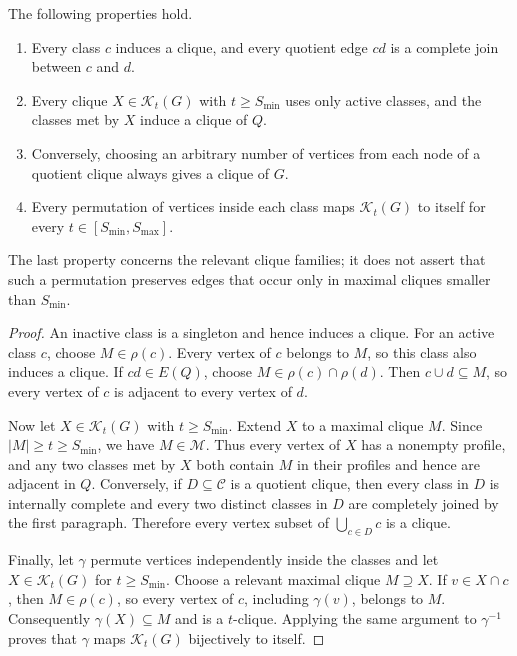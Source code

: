\begin{lemma}
\label{lem:relevant-class-symmetry}
The following properties hold.
\begin{enumerate}
\item Every class $c$ induces a clique, and every quotient edge $cd$ is a complete join between $c$ and $d$.
\item Every clique $X\in\mathcal K_t(G)$ with $t\geq S_{\min}$ uses only active classes, and the classes met by $X$ induce a clique of $Q$.
\item Conversely, choosing an arbitrary number of vertices from each node of a quotient clique always gives a clique of $G$.
\item Every permutation of vertices inside each class maps $\mathcal K_t(G)$ to itself for every $t\in[S_{\min},S_{\max}]$.
\end{enumerate}
The last property concerns the relevant clique families; it does not assert that such a permutation preserves edges that occur only in maximal cliques smaller than $S_{\min}$.
\end{lemma}
\begin{proof}
An inactive class is a singleton and hence induces a clique.
%
For an active class $c$, choose $M\in\rho(c)$.
%
Every vertex of $c$ belongs to $M$, so this class also induces a clique.
%
If $cd\in E(Q)$, choose $M\in\rho(c)\cap\rho(d)$.
%
Then $c\cup d\subseteq M$, so every vertex of $c$ is adjacent to every vertex of $d$.

Now let $X\in\mathcal K_t(G)$ with $t\geq S_{\min}$.
%
Extend $X$ to a maximal clique $M$.
%
Since $|M|\geq t\geq S_{\min}$, we have $M\in\mathcal M$.
%
Thus every vertex of $X$ has a nonempty profile, and any two classes met by $X$ both contain $M$ in their profiles and hence are adjacent in $Q$.
%
Conversely, if $D\subseteq\mathcal C$ is a quotient clique, then every class in $D$ is internally complete and every two distinct classes in $D$ are completely joined by the first paragraph.
%
Therefore every vertex subset of $\bigcup_{c\in D}c$ is a clique.

Finally, let $\gamma$ permute vertices independently inside the classes and let $X\in\mathcal K_t(G)$ for $t\geq S_{\min}$.
%
Choose a relevant maximal clique $M\supseteq X$.
%
If $v\in X\cap c$, then $M\in\rho(c)$, so every vertex of $c$, including $\gamma(v)$, belongs to $M$.
%
Consequently $\gamma(X)\subseteq M$ and is a $t$-clique.
%
Applying the same argument to $\gamma^{-1}$ proves that $\gamma$ maps $\mathcal K_t(G)$ bijectively to itself.
\end{proof}

